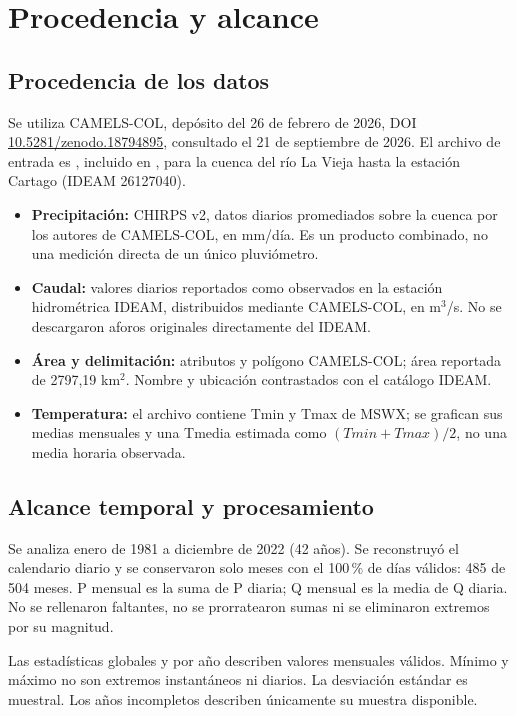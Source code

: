 \section{Procedencia y alcance}
\subsection{Procedencia de los datos}
Se utiliza CAMELS-COL, depósito del 26 de febrero de 2026, DOI
\href{https://doi.org/10.5281/zenodo.18794895}{10.5281/zenodo.18794895}, consultado
el 21 de septiembre de 2026. El archivo de entrada es
, incluido en
, para la cuenca del río
La Vieja hasta la estación Cartago (IDEAM 26127040).
\begin{itemize}
\item \textbf{Precipitación:} CHIRPS v2, datos diarios promediados sobre la cuenca
por los autores de CAMELS-COL, en mm/día. Es un producto combinado, no una
medición directa de un único pluviómetro.
\item \textbf{Caudal:} valores diarios reportados como observados en la estación
hidrométrica IDEAM, distribuidos mediante CAMELS-COL, en m$^3$/s. No se
descargaron aforos originales directamente del IDEAM.
\item \textbf{Área y delimitación:} atributos y polígono CAMELS-COL; área
reportada de 2797,19 km$^2$. Nombre y ubicación contrastados con el catálogo IDEAM.
\item \textbf{Temperatura:} el archivo contiene Tmin y Tmax de MSWX; se grafican sus medias mensuales y una Tmedia estimada como $(Tmin+Tmax)/2$, no una media horaria observada.
\end{itemize}

\subsection{Alcance temporal y procesamiento}
Se analiza enero de 1981 a diciembre de 2022 (42 años). Se reconstruyó el
calendario diario y se conservaron solo meses con el 100\,\% de días válidos:
485 de 504 meses. P mensual es la suma de P diaria; Q mensual es la media de Q
diaria. No se rellenaron faltantes, no se prorratearon sumas ni se eliminaron
extremos por su magnitud.

Las estadísticas globales y por año describen valores mensuales válidos. Mínimo
y máximo no son extremos instantáneos ni diarios. La desviación estándar es
muestral. Los años incompletos describen únicamente su muestra disponible.

